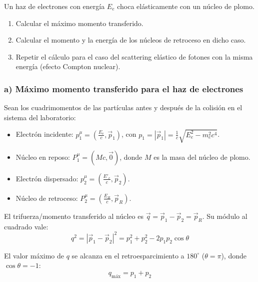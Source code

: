 \begin{problema}
Un haz de electrones con energía $E_e$ choca elásticamente con un núcleo de plomo.

\begin{enumerate}[label=\alph*)]
    \item Calcular el máximo momento transferido.
    \item Calcular el momento y la energía de los núcleos de retroceso en dicho caso.
    \item Repetir el cálculo para el caso del scattering elástico de fotones con la misma energía (efecto Compton nuclear).
\end{enumerate}

\tcblower

\subsubsection*{a) Máximo momento transferido para el haz de electrones}

Sean los cuadrimomentos de las partículas antes y después de la colisión en el sistema del laboratorio:
\begin{itemize}
    \item Electrón incidente: $p_1^\mu = \left(\frac{E_e}{c}, \vec{p}_1\right)$, con $p_1 = |\vec{p}_1| = \frac{1}{c}\sqrt{E_e^2 - m_e^2 c^4}$.
    \item Núcleo en reposo: $P_1^\mu = \left(M c, \vec{0}\right)$, donde $M$ es la masa del núcleo de plomo.
    \item Electrón dispersado: $p_2^\mu = \left(\frac{E'_e}{c}, \vec{p}_2\right)$.
    \item Núcleo de retroceso: $P_2^\mu = \left(\frac{E_R}{c}, \vec{p}_R\right)$.
\end{itemize}

El trifuerza/momento transferido al núcleo es $\vec{q} = \vec{p}_1 - \vec{p}_2 = \vec{p}_R$. Su módulo al cuadrado vale:
\begin{equation*}
q^2 = |\vec{p}_1 - \vec{p}_2|^2 = p_1^2 + p_2^2 - 2 p_1 p_2 \cos\theta
\end{equation*}

El valor máximo de $q$ se alcanza en el retroesparcimiento a $180^\circ$ ($\theta = \pi$), donde $\cos\theta = -1$:
\begin{equation*}
q_{\text{máx}} = p_1 + p_2
\end{equation*}


\end{problema}
